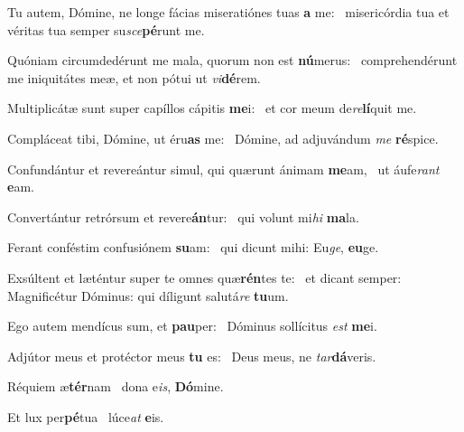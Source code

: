 \item Tu autem, Dómine, ne longe fácias miseratiónes tuas \textbf{a} me:~\psstar{} misericórdia tua et véritas tua semper su\textit{sce}\textbf{pé}runt me.

\item Quóniam circumdedérunt me mala, quorum non est \textbf{nú}merus:~\psstar{} comprehendérunt me iniquitátes meæ, et non pótui ut \textit{vi}\textbf{dé}rem.

\item Multiplicátæ sunt super capíllos cápitis \textbf{me}i:~\psstar{} et cor meum de\textit{re}\textbf{lí}quit me.

\item Compláceat tibi, Dómine, ut éru\textbf{as} me:~\psstar{} Dómine, ad adjuvándum \textit{me} \textbf{ré}spice.

\item Confundántur et revereántur simul, qui quærunt ánimam \textbf{me}am,~\psstar{} ut áufe\textit{rant} \textbf{e}am.

\item Convertántur retrórsum et revere\textbf{án}tur:~\psstar{} qui volunt mi\textit{hi} \textbf{ma}la.

\item Ferant conféstim confusiónem \textbf{su}am:~\psstar{} qui dicunt mihi: Eu\textit{ge}, \textbf{eu}ge.

\item Exsúltent et læténtur super te omnes quæ\textbf{rén}tes te:~\psstar{} et dicant semper: Magnificétur Dóminus: qui díligunt salutá\textit{re} \textbf{tu}um.

\item Ego autem mendícus sum, et \textbf{pau}per:~\psstar{} Dóminus sollícitus \textit{est} \textbf{me}i.

\item Adjútor meus et protéctor meus \textbf{tu} es:~\psstar{} Deus meus, ne \textit{tar}\textbf{dá}veris.

\item Réquiem æ\textbf{tér}nam~\psstar{} dona e\textit{is}, \textbf{Dó}mine.

\item Et lux per\textbf{pé}tua~\psstar{} lúce\textit{at} \textbf{e}is.